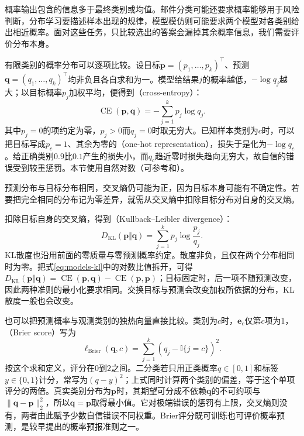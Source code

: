 概率输出包含的信息多于最终类别或均值。邮件分类可能还要求概率能够用于风险判断，分布学习要描述样本出现的规律，模型模仿则可能要求两个模型对各类别给出相近概率。面对这些任务，只比较选出的答案会漏掉其余概率信息，我们需要评价分布本身。

有限类别的概率分布可以逐项比较。设目标$\bm p=(p_1,\ldots,p_k)^{\top}$、预测$\bm q=(q_1,\ldots,q_k)^{\top}$均非负且各自求和为一。模型给结果$j$的概率越低，$-\log q_j$越大；以目标概率$p_j$加权平均，便得到（cross-entropy）：
\begin{equation}
  \operatorname{CE}(\bm{p},\bm{q})=-\sum_{j=1}^{k}p_j\log q_j.
  \label{eq:models-cross-entropy}
\end{equation}
其中$p_j=0$的项约定为零，$p_j>0$而$q_j=0$时取无穷大。已知样本类别为$c$时，可以把目标写成$p_c=1$、其余为零的（one-hot representation），损失于是化为$-\log q_c$。给正确类别$0.9$比$0.1$产生的损失小，而$q_c$趋近零时损失趋向无穷大，故自信的错误受到较重惩罚。本节使用自然对数（可参考和）。

预测分布与目标分布相同，交叉熵仍可能为正，因为目标本身可能有不确定性。若要把完全相同的分布记为零差异，就需从交叉熵中扣除目标分布对自身的交叉熵。

扣除目标自身的交叉熵，得到（Kullback--Leibler divergence）：
\begin{equation}
  D_{\mathrm{KL}}(\bm{p}\Vert\bm{q})
  =\sum_{j=1}^{k}p_j\log\frac{p_j}{q_j}.
  \label{eq:models-kl}
\end{equation}
KL散度也沿用前面的零质量与零预测概率约定。散度非负，且仅在两个分布相同时为零。把式\eqref{eq:models-kl}中的对数比值拆开，可得$D_{\mathrm{KL}}(\bm p\Vert\bm q)=\operatorname{CE}(\bm p,\bm q)-\operatorname{CE}(\bm p,\bm p)$；目标固定时，后一项不随预测改变，因此两种准则的最小化要求相同。交换目标与预测会改变加权所依据的分布，KL散度一般也会改变。

也可以把预测概率与观测类别的独热向量直接比较。类别为$c$时，$\bm e_c$仅第$c$项为1，（Brier score）写为
\begin{equation}
  \ell_{\mathrm{Brier}}(\bm{q},c)
  =\sum_{j=1}^{k}(q_j-\mathbb I\{j=c\})^2.
  \label{eq:models-brier}
\end{equation}
按这个求和定义，评分在$0$到$2$之间。二分类若只用正类概率$q\in[0,1]$和标签$y\in\{0,1\}$计分，常写为$(q-y)^2$；上式同时计算两个类别的偏差，等于这个单项评分的两倍。真实类别分布为$\bm p$时，其期望可分成不依赖$\bm q$的不可约项与$\|\bm q-\bm p\|_2^2$，所以$\bm q=\bm p$取得最小值。它对极端错误的惩罚有上限，交叉熵则没有，两者由此赋予少数自信错误不同权重。Brier评分既可训练也可评价概率预测，是较早提出的概率预报准则之一。

